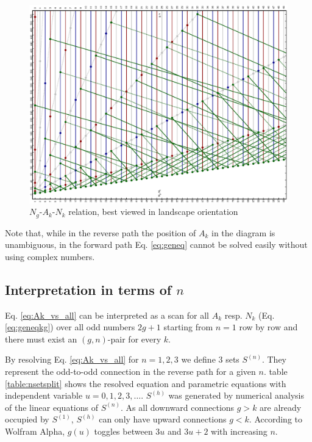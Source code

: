 \documentclass[10pt,a4paper]{article}
\begin{document}
\begin{figure}[!ht]
  \centering
	\includegraphics[width= \paperwidth,angle=-90,keepaspectratio]{collatz_flow.eps}
	\caption{$N_g$-$A_k$-$N_k$ relation, best viewed in landscape orientation}
\label{fig:flow}
\end{figure}

Note that, while in the reverse path the position of $A_k$ in the diagram is unambiguous, in the forward path Eq. \ref{eq:geneq} cannot be solved easily without using complex numbers.

\subsection{Interpretation in terms of $n$}
Eq. \ref{eq:Ak_vs_all} can be interpreted as a scan for all $A_k$ resp. $N_k$ (Eq. \ref{eq:geneqkg}) over all odd numbers $2g+1$ starting from $n=1$ row by row and there must exist an $(g,n)$-pair for every $k$.

By resolving Eq. \ref{eq:Ak_vs_all} for $n=1,2,3$ we define 3 sets $S^{(n)}$. They represent the odd-to-odd connection in the reverse path for a given $n$. table \ref{table:nsetsplit} shows the resolved equation and parametric equations with independent variable $u=0,1,2,3,\ldots$. $S^{(h)}$ was generated by numerical analysis of the linear equations of $S^{(n)}$. As all downward connections $g>k$ are already occupied by $S^{(1)}$, $S^{(h)}$ can only have upward connections $g<k$. According to Wolfram Alpha, $g(u)$ toggles between $3u$ and $3u+2$ with increasing $n$.
\end{document}
